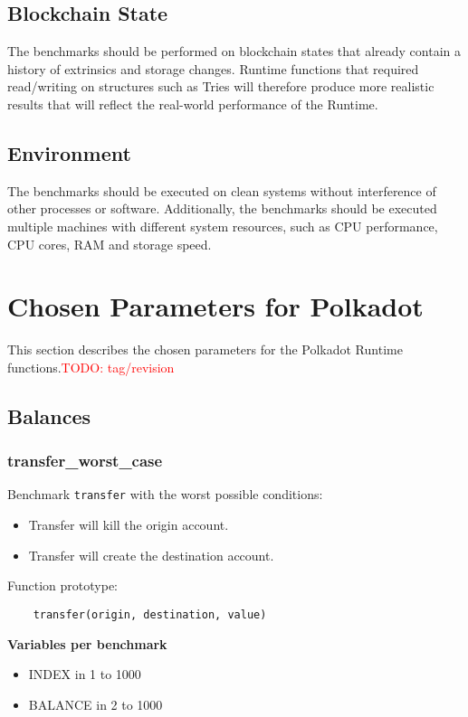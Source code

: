 \documentclass[11pt,a4paper]{article}
\newcommand{\todo}[1]{\textcolor{red}{TODO: #1}}
\begin{document}
\subsection{Blockchain State}
The benchmarks should be performed on blockchain states that already contain a history of
extrinsics and storage changes. Runtime functions that required read/writing on structures
such as Tries will therefore produce more realistic results that will reflect the real-world
performance of the Runtime.

\subsection{Environment}
The benchmarks should be executed on clean systems without interference of other processes
or software. Additionally, the benchmarks should be executed multiple machines with different
system resources, such as CPU performance, CPU cores, RAM and storage speed.

\section{Chosen Parameters for Polkadot}
This section describes the chosen parameters for the Polkadot Runtime functions.\todo{tag/revision}

\subsection{Balances}

\subsubsection{transfer\_worst\_case}

Benchmark \verb|transfer| with the worst possible conditions:
\begin{itemize}
\item Transfer will kill the origin account.
\item Transfer will create the destination account.
\end{itemize}

Function prototype:

\begin{verbatim}
    transfer(origin, destination, value)
\end{verbatim}

\textbf{Variables per benchmark}
\begin{itemize}
\item INDEX in 1 to 1000
\item BALANCE in 2 to 1000
\end{itemize}
\end{document}
